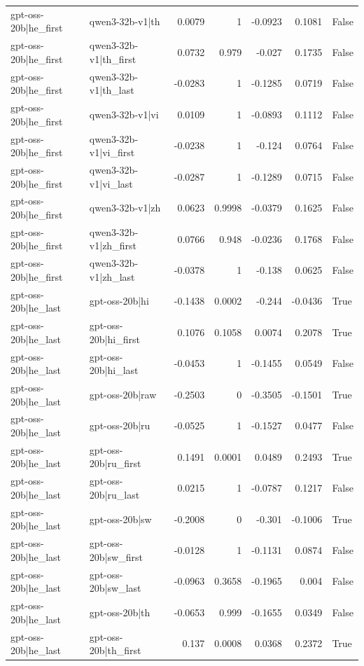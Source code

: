 \begin{table}
\begin{tabular}{l l r r r r l}
gpt-oss-20b|he_first & qwen3-32b-v1|th & 0.0079 & 1 & -0.0923 & 0.1081 & False \\
gpt-oss-20b|he_first & qwen3-32b-v1|th_first & 0.0732 & 0.979 & -0.027 & 0.1735 & False \\
gpt-oss-20b|he_first & qwen3-32b-v1|th_last & -0.0283 & 1 & -0.1285 & 0.0719 & False \\
gpt-oss-20b|he_first & qwen3-32b-v1|vi & 0.0109 & 1 & -0.0893 & 0.1112 & False \\
gpt-oss-20b|he_first & qwen3-32b-v1|vi_first & -0.0238 & 1 & -0.124 & 0.0764 & False \\
gpt-oss-20b|he_first & qwen3-32b-v1|vi_last & -0.0287 & 1 & -0.1289 & 0.0715 & False \\
gpt-oss-20b|he_first & qwen3-32b-v1|zh & 0.0623 & 0.9998 & -0.0379 & 0.1625 & False \\
gpt-oss-20b|he_first & qwen3-32b-v1|zh_first & 0.0766 & 0.948 & -0.0236 & 0.1768 & False \\
gpt-oss-20b|he_first & qwen3-32b-v1|zh_last & -0.0378 & 1 & -0.138 & 0.0625 & False \\
gpt-oss-20b|he_last & gpt-oss-20b|hi & -0.1438 & 0.0002 & -0.244 & -0.0436 & True \\
gpt-oss-20b|he_last & gpt-oss-20b|hi_first & 0.1076 & 0.1058 & 0.0074 & 0.2078 & True \\
gpt-oss-20b|he_last & gpt-oss-20b|hi_last & -0.0453 & 1 & -0.1455 & 0.0549 & False \\
gpt-oss-20b|he_last & gpt-oss-20b|raw & -0.2503 & 0 & -0.3505 & -0.1501 & True \\
gpt-oss-20b|he_last & gpt-oss-20b|ru & -0.0525 & 1 & -0.1527 & 0.0477 & False \\
gpt-oss-20b|he_last & gpt-oss-20b|ru_first & 0.1491 & 0.0001 & 0.0489 & 0.2493 & True \\
gpt-oss-20b|he_last & gpt-oss-20b|ru_last & 0.0215 & 1 & -0.0787 & 0.1217 & False \\
gpt-oss-20b|he_last & gpt-oss-20b|sw & -0.2008 & 0 & -0.301 & -0.1006 & True \\
gpt-oss-20b|he_last & gpt-oss-20b|sw_first & -0.0128 & 1 & -0.1131 & 0.0874 & False \\
gpt-oss-20b|he_last & gpt-oss-20b|sw_last & -0.0963 & 0.3658 & -0.1965 & 0.004 & False \\
gpt-oss-20b|he_last & gpt-oss-20b|th & -0.0653 & 0.999 & -0.1655 & 0.0349 & False \\
gpt-oss-20b|he_last & gpt-oss-20b|th_first & 0.137 & 0.0008 & 0.0368 & 0.2372 & True \\

\end{tabular}
\end{table}
